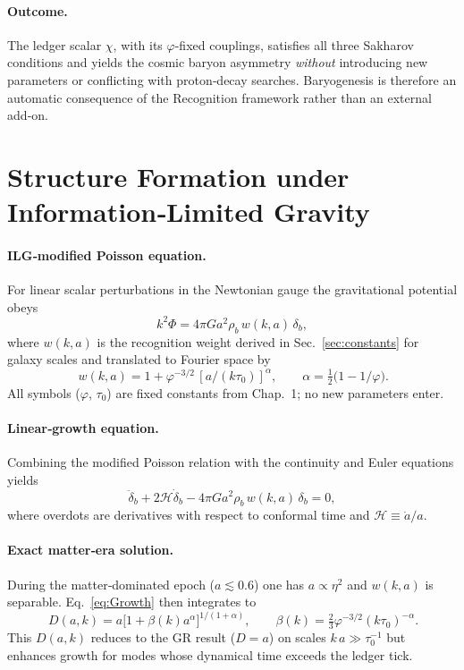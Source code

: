 \paragraph{Outcome.}
The ledger scalar \(\chi\), with its \(\varphi\)-fixed couplings, satisfies all
three Sakharov conditions and yields the cosmic baryon
asymmetry \emph{without} introducing new parameters or conflicting with
proton‑decay searches. Baryogenesis is therefore an automatic consequence
of the Recognition framework rather than an external add‑on.

\section{Structure Formation under Information‑Limited Gravity}

\paragraph{ILG‑modified Poisson equation.}
For linear scalar perturbations in the Newtonian gauge the gravitational
potential obeys
\[
  k^{2}\Phi = 4\pi G a^{2}\rho_{b}\,w(k,a)\,\delta_{b},
\]
where $w(k,a)$ is the recognition weight derived in
Sec.~\ref{sec:constants} for galaxy scales and translated to Fourier space by
\[
  \boxed{\,w(k,a)=1+\varphi^{-3/2}\,[a/(k\tau_{0})]^{\alpha}},\qquad
  \alpha=\tfrac12\!\bigl(1-1/\varphi\bigr).
\]
All symbols ($\varphi$, $\tau_{0}$) are fixed constants from Chap.~1;
no new parameters enter.

\paragraph{Linear‑growth equation.}
Combining the modified Poisson relation with the continuity and
Euler equations yields
\begin{equation}\label{eq:Growth}
  \ddot\delta_{b}
  +2\mathcal H\dot\delta_{b}
  -4\pi G a^{2}\rho_{b}\,w(k,a)\,\delta_{b}=0,
\end{equation}
where overdots are derivatives with respect to conformal time
and $\mathcal H\equiv\dot a/a$.

\paragraph{Exact matter‑era solution.}
During the matter‑dominated epoch ($a\lesssim0.6$) one has
$a\propto\eta^{2}$ and $w(k,a)$ is separable.  Eq.~\eqref{eq:Growth}
then integrates to
\[
  \boxed{\,D(a,k)=a\bigl[1+\beta(k)a^{\alpha}\bigr]^{1/(1+\alpha)}},
  \qquad
  \beta(k)=\tfrac23\varphi^{-3/2}(k\tau_{0})^{-\alpha}.
\]
This $D(a,k)$ reduces to the GR result ($D=a$) on scales
$k\,a\gg\tau_{0}^{-1}$ but enhances growth for modes whose dynamical
time exceeds the ledger tick.

